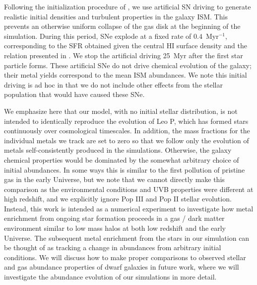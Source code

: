 \documentclass[fleqn,usenatbib,useAMS]{mnras}
\begin{document}
Following the initialization procedure of \citet{Hu2017}, we use artificial SN driving to generate realistic initial densities and turbulent properties in the galaxy ISM. This prevents an otherwise uniform collapse of the gas disk at the beginning of the simulation. During this period, SNe explode at a fixed rate of $0.4$~Myr$^{-1}$, corresponding to the SFR obtained given the central HI surface density and the relation presented in \citep{Roychowdhury2009}. We stop the artificial driving 25~Myr after the first star particle forms. These artificial SNe do not drive chemical evolution of the galaxy; their metal yields correspond to the mean ISM abundances. We note this initial driving is ad hoc in that we do not include other effects from the stellar population that would have caused these SNe.

We emphasize here that our model, with no initial stellar distribution, is not intended to identically reproduce the evolution of Leo P, which has formed stars continuously over cosmological timescales. In addition, the mass fractions for the individual metals we track are set to zero so that we follow only the evolution of metals self-consistently produced in the simulations. Otherwise, the galaxy chemical properties would be dominated by the somewhat arbitrary choice of initial abundances. In some ways this is similar to the first pollution of pristine gas in the early Universe, but we note that we cannot directly make this comparison as the environmental conditions and UVB properties were different at high redshift, and we explicitly ignore Pop III and Pop II stellar evolution. Instead, this work is intended as a numerical experiment to investigate how metal enrichment from ongoing star formation proceeds in a gas / dark matter environment similar to low mass halos at both low redshift and the early Universe. The subsequent metal enrichment from the stars in our simulation can be thought of as tracking 
a change in abundances from arbitrary initial conditions. We will discuss how to make proper comparisons to observed stellar and gas abundance properties of dwarf galaxies in future work, where we will investigate the abundance evolution of our simulations in more detail.
\end{document}
